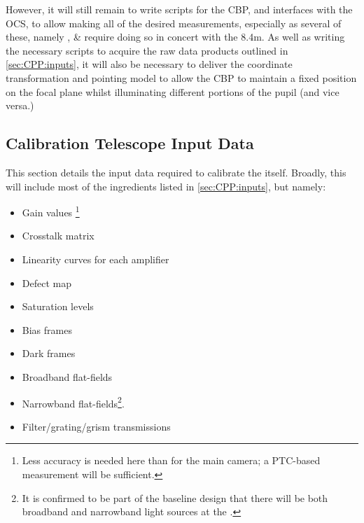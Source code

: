 However, it will still remain to write scripts for the CBP, and interfaces with the OCS, to allow making all of the desired measurements, especially as several of these, namely \xxx, \xxx \& \xxx require doing so in concert with the 8.4m.
\alg As well as writing the necessary scripts to acquire the raw data products outlined in \secsymbol\ref{sec:CPP:inputs}, it will also be necessary to deliver the coordinate transformation and pointing model to allow the CBP to maintain a fixed position on the focal plane whilst illuminating different portions of the pupil (and vice versa.)


















\subsection{Calibration Telescope Input Data}
\label{sec:CPP:auxTelescope:inputs}
This section details the input data required to calibrate the \auxtelescope itself. Broadly, this will include most of the ingredients listed in \secsymbol\ref{sec:CPP:inputs}, but namely:

\begin{itemize}
	\item Gain values \footnote{Less accuracy is needed here than for the main camera; a PTC-based measurement will be sufficient.}
	\item Crosstalk matrix
	\item Linearity curves for each amplifier
	\item Defect map
	\item Saturation levels
	\item Bias frames
	\item Dark frames
	\item Broadband flat-fields
	\item Narrowband flat-fields\footnote{ It is confirmed to be part of the baseline design that there will be both broadband and narrowband light sources at the \auxtelescope.}.
	\item Filter/grating/grism transmissions
\end{itemize}

